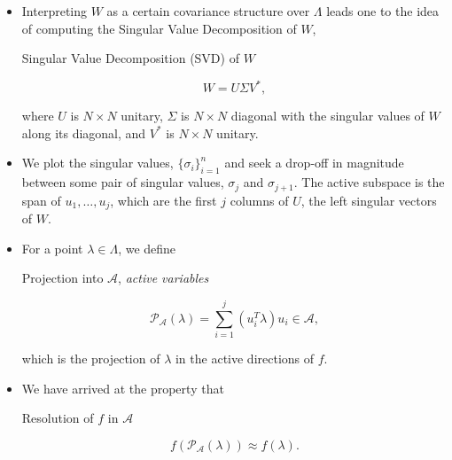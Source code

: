 \documentclass[11pt]{beamer}
\newcommand{\A}{\mathcal{A}}
\begin{document}
\begin{frame}

\begin{itemize}



\item Interpreting $W$ as a certain covariance structure over $\Lambda$ leads one to the idea of computing the Singular Value Decomposition of $W$,

\begin{block}{Singular Value Decomposition (SVD) of $W$}

\begin{equation} \label{eq:5}
W=U\Sigma V^*,
\end{equation} 


\noindent where $U$ is $N \times N$ unitary, $\Sigma$ is $N \times N$ diagonal with the singular values of $W$ along its diagonal, and $V^*$ is $N \times N$ unitary.

\end{block}

\item We plot the singular values, $\{\sigma_i\}_{i=1}^n$ and seek a drop-off in magnitude between some pair of singular values, $\sigma_{j}$ and $\sigma_{j+1}$. The active subspace is the span of $u_1,\ldots,u_{j}$, which are the first $j$ columns of $U$, the left singular vectors of $W$. 


\end{itemize}

\end{frame}

\begin{frame}

\begin{itemize}

	\item For a point $\lambda \in \Lambda$, we define

\begin{block}{Projection into $\mathcal{A}$, \textit{active variables}}

\begin{equation} \label{eq:6}
  \mathcal{P}_\A(\lambda)=\sum_{i=1}^{j}\left( u_i^T \lambda\right)u_i \in \A, 
\end{equation}

\noindent which is the projection of $\lambda$ in the active directions of $f$.

\end{block}

\item We have arrived at the property that 

\begin{block}{Resolution of $f$ in $\mathcal{A}$}

\begin{equation} \label{eq:7}
f\left(\mathcal{P}_\A(\lambda)\right) \approx f(\lambda).
\end{equation}

\end{block}

\end{itemize}



\end{frame}
\end{document}
